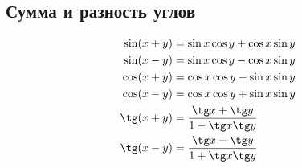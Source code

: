 \subsection*{Сумма и разность углов}

\begin{align*}
  \sin(x + y) &= \sin x \cos y + \cos x \sin y\\
  \sin(x - y) &= \sin x \cos y - \cos x \sin y\\
  \cos(x + y) &= \cos x \cos y - \sin x \sin y\\
  \cos(x - y) &= \cos x \cos y + \sin x \sin y\\
  \tg(x + y) &= \frac{\tg x + \tg y}{1 - \tg x \tg y}\\
  \tg(x - y) &= \frac{\tg x - \tg y}{1 + \tg x \tg y}
\end{align*}